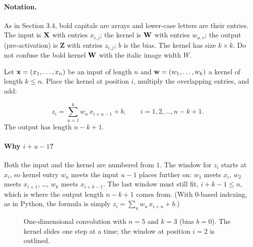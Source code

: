 \documentclass[12pt, a4paper]{article}
\providecommand{\bZ}{\mathbf{Z}}
\newcommand{\drawgrid}[3]{%
  \begin{scope}[shift={#1}]
    \foreach \row [count=\r] in {#3} {
        \foreach \v [count=\c] in \row {
            \draw[gray!70, fill=#2] (\c-1,-\r+1) rectangle ++(1,-1);
            \node[font=\small] at (\c-0.5,-\r+0.5) {$\v$};
          }
      }
  \end{scope}%
}
\begin{document}
\paragraph{Notation.}
As in Section 3.4, bold capitals are arrays and lower-case letters are their
entries. The input is $\mathbf{X}$ with entries $x_{i,j}$; the kernel is $\mathbf{W}$ with
entries $w_{u,v}$; the output (pre-activation) is $\bZ$ with entries
$z_{i,j}$; $b$ is the bias. The kernel has size $k \times k$. Do not confuse
the bold kernel $\mathbf{W}$ with the italic image width $W$.

\medskip
Let $\mathbf{x} = (x_1, \dots, x_n)$ be an input of length $n$ and
$\mathbf{w} = (w_1, \dots, w_k)$ a kernel of length $k \le n$. Place the kernel at
position $i$, multiply the overlapping entries, and add:

\begin{resultbox}
  \[
    z_i = \sum_{u=1}^{k} w_u\, x_{i+u-1} + b,
    \qquad i = 1, 2, \dots, n - k + 1.
  \]
  The output has length $n - k + 1$.
\end{resultbox}

\paragraph{Why $i + u - 1$?}
Both the input and the kernel are numbered from $1$. The window for $z_i$
starts at $x_i$, so kernel entry $w_u$ meets the input $u - 1$ places further
on: $w_1$ meets $x_i$, $w_2$ meets $x_{i+1}$, \dots, $w_k$ meets
$x_{i+k-1}$. The last window must still fit, $i + k - 1 \le n$, which is where
the output length $n - k + 1$ comes from. (With 0-based indexing, as in
Python, the formula is simply $z_i = \sum_{u} w_u\, x_{i+u} + b$.)

\begin{figure}[H]
  \centering
  \caption{One-dimensional convolution with $n = 5$ and $k = 3$ (bias $b = 0$).
    The kernel slides one step at a time; the window at position $i = 2$ is
    outlined.}
  \label{fig:conv1d}
\end{figure}
\end{document}
